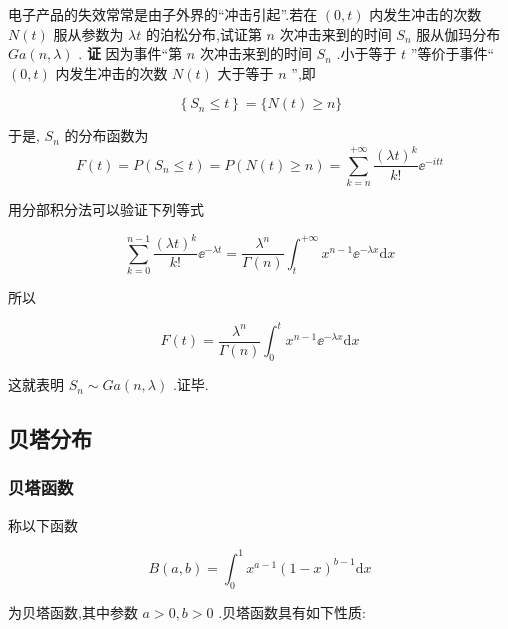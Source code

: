 \begin{example}
	电子产品的失效常常是由子外界的“冲击引起”.若在 $ (0,t) $ 内发生冲击的次数 $ N(t) $ 服从参数为 $ \lambda t $ 的泊松分布,试证第 $ n $ 次冲击来到的时间 $ S_{n} $ 服从伽玛分布 $ G a(n, \lambda) $ .
	\textbf{证} 因为事件“第 $ n $ 次冲击来到的时间 $ S_{n} $ .小于等于 $ t $ ”等价于事件“ $ (0,t) $ 
	内发生冲击的次数 $ N(t) $ 大于等于 $ n $ ”,即
	
	\[
	\left\{S_{n} \leqslant t\right\}=\{N(t) \geqslant n\}
	\]
	
	于是, $ S_{n} $ 的分布函数为
	\[
	F(t)=P\left(S_{n} \leqslant t\right)=P(N(t) \geqslant n)=\sum_{k=n}^{+\infty} \frac{(\lambda t)^{k}}{k !} \ee ^{-i t t}
	\]
	
	用分部积分法可以验证下列等式
	
	\begin{equation}
	\sum_{k=0}^{n-1} \frac{(\lambda t)^{k}}{k !} \ee ^{-\lambda t}=\frac{\lambda^{n}}{\Gamma(n)} \int_{t}^{+\infty} x^{n-1} \ee ^{-\lambda x} \mathrm{d} x \label{eq:2.5.16}
	\end{equation}
	
	所以
	
	\[
	F(t)=\frac{\lambda^{n}}{\Gamma(n)} \int_{0}^{t} x^{n-1} \ee ^{-\lambda x} \mathrm{d} x
	\]
	
	这就表明 $ S_{n} \sim G a(n, \lambda) $ .证毕.
\end{example}

\subsection{贝塔分布}

\subsubsection{贝塔函数}

称以下函数

\begin{equation}
B(a, b)=\int_{0}^{1} x^{a-1}(1-x)^{b-1} \mathrm{d} x \label{eq:2.5.17}
\end{equation}

为贝塔函数,其中参数 $ a>0,b>0 $ .贝塔函数具有如下性质:

